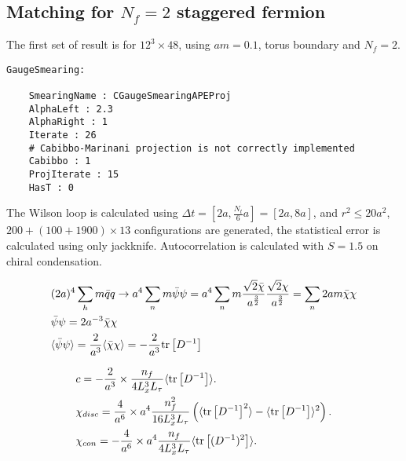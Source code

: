 \subsection{\label{matchingstaggerednf2}Matching for $N_f=2$ staggered fermion}

The first set of result is for $12^3 \times 48$, using $am=0.1$, torus boundary and $N_f=2$.

\begin{lstlisting}[style=yaml]
GaugeSmearing:

    SmearingName : CGaugeSmearingAPEProj
    AlphaLeft : 2.3
    AlphaRight : 1
    Iterate : 26
    # Cabibbo-Marinani projection is not correctly implemented
    Cabibbo : 1
    ProjIterate : 15
    HasT : 0
\end{lstlisting}

The Wilson loop is calculated using $\Delta t = [2a, \frac{N_t}{6}a]=[2a, 8a]$, and $r^2\leq 20 a^2$, $200+(100+1900)\times 13$ configurations are generated, the statistical error is calculated using only jackknife.
Autocorrelation is calculated with $S=1.5$ on chiral condensation.

\begin{equation}
\begin{split}
&(2a)^4\sum _{h}m\bar{q}q \to a^4 \sum _n m\bar{\psi}\psi = a^4 \sum _n m\frac{\sqrt{2}\bar{\chi}}{a^{\frac{3}{2}}}\frac{\sqrt{2}\chi}{a^{\frac{3}{2}}}=\sum _n 2am \bar{\chi}\chi \\
&\bar{\psi}\psi=2a^{-3}\bar{\chi}\chi\\
&\langle \bar{\psi}\psi\rangle =\frac{2}{a^3}\langle \bar{\chi}\chi\rangle = -\frac{2}{a^3} {\rm tr}\left[D^{-1}\right]\\
\end{split}
\label{eq.cqdefine}
\end{equation}

\begin{equation}
\begin{split}
&c=-\frac{2}{a^3}\times \frac{n_f}{4L_x^3L_{\tau}}\langle {\rm tr}\left[D^{-1}\right]\rangle.\\
&\chi _{disc}=\frac{4}{a^6} \times a^4\frac{n_f^2}{16L_x^3L_{\tau}}\left(\langle {\rm tr}\left[D^{-1}\right]^2\rangle-\langle {\rm tr}\left[D^{-1}\right]\rangle^2\right).\\
&\chi _{con}=-\frac{4}{a^6} \times a^4\frac{n_f}{4L_x^3L_{\tau}}\langle {\rm tr}\left[(D^{-1})^2\right]\rangle.\\
\end{split}
\label{eq.cqdefine}
\end{equation}

